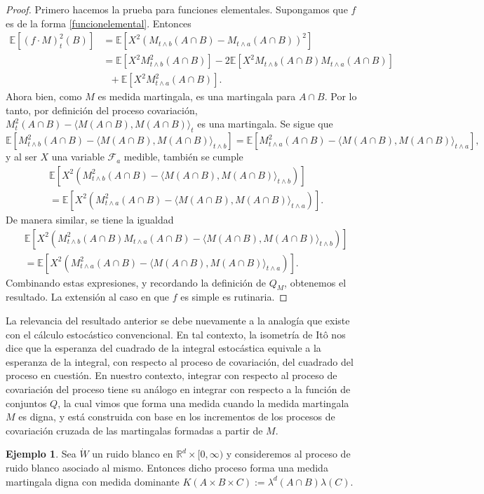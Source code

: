 \documentclass[letterpaper,twoside,12pt]{book}
\newcommand{\R}{\mathbb{R}}
\newcommand{\F}{\mathcal{F}}
\newcommand{\E}{\mathbb{E}}
\newcommand{\W}{\dot{W}}
\newcommand{\1}{\mathds{1}}
\theoremstyle{definition}
\theoremstyle{definition}
\theoremstyle{remark}
\theoremstyle{definition}
\theoremstyle{definition}
\theoremstyle{definition}
\theoremstyle{definition}
\newtheorem{ejem}{Ejemplo}
\theoremstyle{definition}
\begin{document}
\begin{proof} 
   Primero hacemos la prueba para funciones elementales. Supongamos que $f$ es de la forma \eqref{funcionelemental}. Entonces 
   \begin{align*}
      \E\left[(f\cdot M)^2_t(B)\right]&=\E\left[X^2 \left(M_{t\wedge b}(A\cap B)-M_{t\wedge a}(A\cap B)\right)^2\right]\\
      &=\E\left[X^2M_{t\wedge b}^2(A\cap B)\right]-2 \E\left[X^2M_{t\wedge b}(A\cap B)M_{t\wedge a}(A\cap B)\right]\\
      &\ \ \ +\E\left[X^2M^2_{t\wedge a}(A\cap B)\right].
   \end{align*}
   Ahora bien, como $M$ es medida martingala, es una martingala para $A\cap B$. Por lo tanto, por definición del proceso covariación, $M^2_t(A\cap B)-\langle M(A\cap B),M(A\cap B)\rangle_t$ es una martingala. Se sigue que 
   \[
   \E\left[M_{t\wedge b}^2(A\cap B)-\langle M(A\cap B),M(A\cap B)\rangle_{t\wedge b}\right]=\E\left[M_{t\wedge a}^2(A\cap B)-\langle M(A\cap B),M(A\cap B)\rangle_{t\wedge a}\right],
   \]
   y al ser $X$ una variable $\F_a$ medible, también se cumple 
      \begin{align*}
         &\E\left[X^2 \left(M_{t\wedge b}^2(A\cap B)-\langle M(A\cap B),M(A\cap B)\rangle_{t\wedge b}\right)\right]\\
         &=\E\left[X^2 \left(M_{t\wedge a}^2(A\cap B)-\langle M(A\cap B),M(A\cap B)\rangle_{t\wedge a}\right)\right].
      \end{align*}
   De manera similar, se tiene la igualdad 
   \begin{align*}
      &\E\left[X^2 \left(M_{t\wedge b}^2(A\cap B)M_{t\wedge a}(A\cap B)-\langle M(A\cap B),M(A\cap B)\rangle_{t\wedge b}\right)\right]\\
      &=\E\left[X^2 \left(M_{t\wedge a}^2(A\cap B)-\langle M(A\cap B),M(A\cap B)\rangle_{t\wedge a}\right)\right].
   \end{align*}
   Combinando estas expresiones, y recordando la definición de $Q_M$, obtenemos el resultado. La extensión al caso en que $f$ es simple es rutinaria.
 \end{proof}
La relevancia del resultado anterior se debe nuevamente a la analogía que existe con el cálculo estocástico convencional. En tal contexto, la isometría de Itô nos dice que la esperanza del cuadrado de la integral estocástica equivale a la esperanza de la integral, con respecto al proceso de covariación, del cuadrado del proceso en cuestión. En nuestro contexto, integrar con respecto al proceso de covariación del proceso tiene su análogo en integrar con respecto a la función de conjuntos $Q$, la cual vimos que forma una medida cuando la medida martingala $M$ es digna, y está construida con base en los incrementos de los procesos de covariación cruzada de las martingalas formadas a partir de $M$.
\begin{ejem} 
Sea $\W$ un ruido blanco en $\R^{d}\times[0,\infty)$ y consideremos al proceso de ruido blanco asociado al mismo. Entonces dicho proceso forma una medida martingala digna con medida dominante $K(A\times B \times C):=\lambda^{d}(A\cap B)\lambda(C)$.
\end{ejem}
\end{document}
